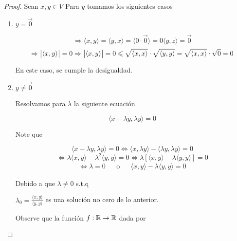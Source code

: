\begin{proof}
    Sean $x,y \in V$ Para $y$ tomamos los siguientes casos

    \begin{enumerate}
        \item $y=\vec{0}$

        \begin{equation*}
            \Rightarrow \langle x,y \rangle = \langle y,x \rangle = \langle 0 \cdot \vec{0} \rangle = 0 \langle y,z \rangle = \vec{0}
        \end{equation*}
        \begin{equation*}
            \Rightarrow \abs{\langle x,y \rangle} = 0 \Rightarrow \abs{\langle x,y \rangle} = 0 \leqslant \sqrt{\langle x,x \rangle} \cdot \sqrt{\langle y,y \rangle} = \sqrt{\langle x,x \rangle} \cdot \sqrt{0} = 0
        \end{equation*}

        En este caso, se cumple la desigualdad.
        \item $y \neq \vec{0}$

        Resolvamos para $\lambda$ la siguiente ecuación 

        \begin{equation*}
            \langle x - \lambda y , \lambda y \rangle = 0
        \end{equation*}
        
        Note que 

        \begin{equation*}
            \langle x - \lambda y , \lambda y \rangle = 0 \iff \langle x , \lambda y \rangle - \langle \lambda y , \lambda y \rangle = 0
        \end{equation*}
        \begin{equation*}
            \Leftrightarrow \lambda \langle x,y \rangle - \lambda^2 \langle y,y \rangle = 0 \iff \lambda [ \langle x,y \rangle - \lambda \langle y ,y \rangle ] = 0
        \end{equation*}
        \begin{align*}
            \iff \lambda = 0& & \text{o} & & \langle x,y \rangle - \lambda \langle y ,y \rangle = 0
        \end{align*}

        Debido a que $\lambda \neq 0$ s.t.q

        $\lambda_0 = \frac{\langle x,y \rangle}{\langle y,y \rangle}$ es una solución no cero de lo anterior.

        Observe que la función $f : \mathbb{R} \to \mathbb{R}$ dada por 


\end{enumerate}
\end{proof}
